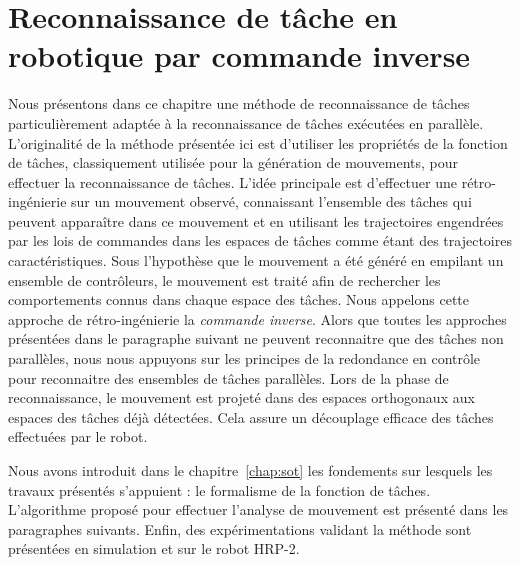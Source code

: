 \chapter{Reconnaissance de t\^ache en robotique par commande inverse}
\label{chap:reco}
Nous présentons dans ce chapitre une méthode de reconnaissance de t\^aches
particulièrement adaptée à la reconnaissance de t\^aches exécutées en parallèle.
%
L'originalité de la méthode présentée ici est d'utiliser les propriétés de la fonction de t\^aches,
classiquement utilisée pour la génération de mouvements,
pour effectuer la reconnaissance de t\^aches. L'idée principale est d'effectuer
une rétro-ingénierie sur un mouvement observé, connaissant l'ensemble 
des t\^aches qui peuvent appara\^itre dans ce mouvement et en utilisant les 
trajectoires engendrées par les lois de commandes dans 
les espaces de t\^aches comme étant des trajectoires caractéristiques.
Sous l'hypothèse que le mouvement a été généré en empilant un ensemble
de contrôleurs, le mouvement est traité afin de rechercher les comportements
connus dans chaque espace des t\^aches.
Nous appelons cette approche de rétro-ingénierie la \emph{commande inverse}.
Alors que toutes les approches présentées dans le paragraphe suivant ne peuvent reconnaitre que
des t\^aches non parallèles, nous nous appuyons sur les principes de la redondance
en contrôle pour reconnaitre des ensembles de t\^aches parallèles.
Lors de la phase de reconnaissance, le mouvement est projeté dans 
des espaces orthogonaux aux espaces des t\^aches déjà détectées.
Cela assure un découplage efficace des t\^aches effectuées par le robot.

Nous avons introduit dans le chapitre~\ref{chap:sot} les fondements sur lesquels 
les travaux présentés s'appuient : le formalisme de la fonction de t\^aches.
L'algorithme proposé pour effectuer l'analyse de mouvement est présenté dans les
paragraphes suivants.
Enfin, des expérimentations validant la méthode sont présentées en simulation
et sur le robot HRP-2.

